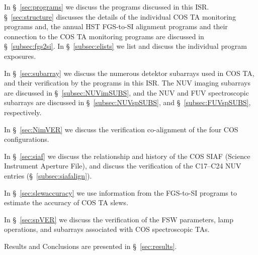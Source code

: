 In \S~\ref{sec:programs} we discuss the programs discussed in this ISR.
\S~\ref{sec:structure} discusses the details of the individual
COS TA monitoring programs and, the annual HST FGS-to-SI alignment programs and their
connection to the COS TA monitoring programs are discussed in \S~\ref{subsec:fgs2si}.
In \S~\ref{subsec:elists} we list and discuss the individual program exposures.

In \S~\ref{sec:subarray} we discuss the numerous detektor subarrays used in COS TA, and their verification by the programs in this ISR.
The NUV imaging subarrays are discussed in \S~\ref{subsec:NUVimSUBS},
and the NUV and FUV spectroscopic subarrays are discussed in  \S~\ref{subsec:NUVspSUBS},
and  \S~\ref{subsec:FUVspSUBS}, respectively.

In \S~\ref{sec:NimVER} we discuss the verification co-alignment of the four COS  configurations.

In \S~\ref{sec:siaf} we discuss the relationship and history of the COS SIAF (Science Instrument Aperture File),
and discuss the verification of the C17--C24 NUV entries (\S~\ref{subsec:siafalign}).

In \S~\ref{sec:slewaccuracy} we use information from the FGS-to-SI programs to estimate the accuracy of COS TA slews.

In \S~\ref{sec:spVER} we discuss the verification of the FSW parameters, lamp operations, and subarrays associated with COS spectroscopic TAs.

Results and Conclusions are presented in \S~\ref{sec:results}.
